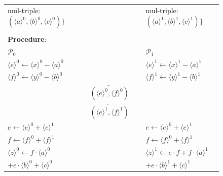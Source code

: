 \documentclass[letterpaper]{article} %
\begin{document}
\begin{figure}
{\begin{tabular}{lcl}
            mul-triple:$
            (\langle a\rangle ^{0},\langle b\rangle ^{0},\langle c\rangle ^{0})\}$
            &
            &
            mul-triple:$ (\langle a\rangle ^{1},\langle b\rangle ^{1},\langle c\rangle ^{1})\}$
            \\
            \\
            \textbf{Procedure}:\\
            $\mathcal{P}_{0}$ &  &  $\mathcal{P}_{1}$ \\
            $\langle e\rangle ^{0}\leftarrow\langle x\rangle ^{0}-\langle a\rangle ^{0}$
            &
            &
            $\langle e\rangle ^{1}\leftarrow\langle x\rangle ^{1}-\langle a\rangle ^{1}$
            \\
            $\langle f\rangle ^{0}\leftarrow\langle y\rangle ^{0}-\langle b\rangle ^{0}$
            &
            &
            $\langle f\rangle ^{1}\leftarrow\langle y\rangle ^{1}-\langle b\rangle ^{1}$
            \\
            & $\underrightarrow{~~~~~~(\langle e\rangle ^{0},\langle f\rangle ^{0})~~~~~~}$ &\\
            & $\underleftarrow{~~~~~~(\langle e\rangle ^{1},\langle f\rangle ^{1})~~~~~~}$ &\\
            $e\leftarrow\langle e\rangle ^{0}+\langle e\rangle ^{1}$& &$e\leftarrow\langle e\rangle ^{0}+\langle e\rangle ^{1}$\\
            $f\leftarrow\langle f\rangle ^{0}+\langle f\rangle ^{1}$& &$f\leftarrow\langle f\rangle ^{0}+\langle f\rangle ^{1}$\\
            $\langle z\rangle^{0}\leftarrow f\cdot \langle a\rangle^{0}$
            & &
            $\langle z\rangle^{1}\leftarrow e \cdot f + f\cdot \langle a\rangle^{1}$\\
            $+e \cdot \langle b\rangle^{0} + \langle c\rangle^{0}$& &$+e \cdot \langle b\rangle^{1} + \langle c\rangle^{1}$\\
            \hline




        \end{tabular}}

    \end{figure}
\end{document}
